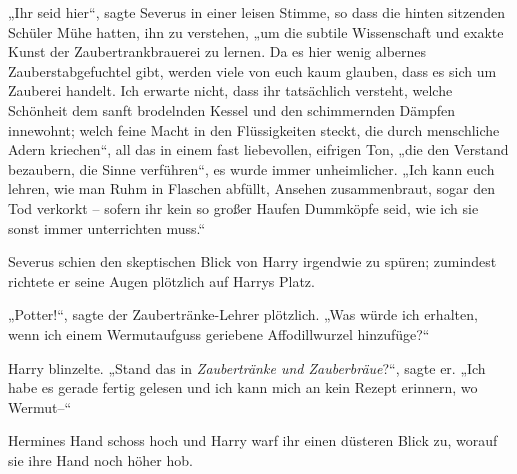 „Ihr seid hier“, sagte Severus in einer leisen Stimme, so dass die hinten sitzenden Schüler Mühe hatten, ihn zu verstehen, „um die subtile Wissenschaft und exakte Kunst der Zaubertrankbrauerei zu lernen. Da es hier wenig albernes Zauberstabgefuchtel gibt, werden viele von euch kaum glauben, dass es sich um Zauberei handelt. Ich erwarte nicht, dass ihr tatsächlich versteht, welche Schönheit dem sanft brodelnden Kessel und den schimmernden Dämpfen innewohnt; welch feine Macht in den Flüssigkeiten steckt, die durch menschliche Adern kriechen“, all das in einem fast liebevollen, eifrigen Ton, „die den Verstand bezaubern, die Sinne verführen“, es wurde immer unheimlicher. „Ich kann euch lehren, wie man Ruhm in Flaschen abfüllt, Ansehen zusammenbraut, sogar den Tod verkorkt – sofern ihr kein so großer Haufen Dummköpfe seid, wie ich sie sonst immer unterrichten muss.“ 

Severus schien den skeptischen Blick von Harry irgendwie zu spüren; zumindest richtete er seine Augen plötzlich auf Harrys Platz. 

„Potter!“, sagte der Zaubertränke-Lehrer plötzlich. „Was würde ich erhalten, wenn ich einem Wermutaufguss geriebene Affodillwurzel hinzufüge?“ 

Harry blinzelte. „Stand das in \emph{Zaubertränke und Zauberbräue}?“, sagte er. „Ich habe es gerade fertig gelesen und ich kann mich an kein Rezept erinnern, wo Wermut–“ 

Hermines Hand schoss hoch und Harry warf ihr einen düsteren Blick zu, worauf sie ihre Hand noch höher hob. 

